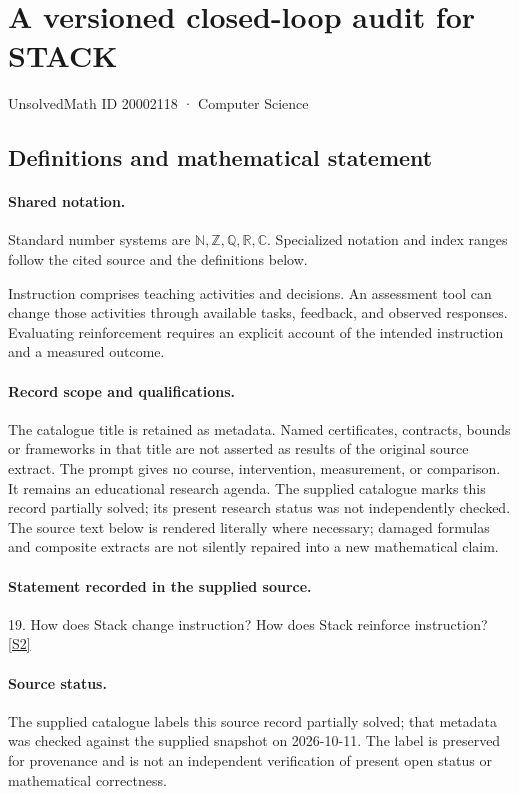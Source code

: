 \documentclass[11pt]{article}
\newcommand{\sref}[2]{\hyperlink{source:#1:#2}{[S#2]}}
\begin{document}
\setcounter{section}{20002117}
\section{A versioned closed-loop audit for STACK}\label{20002118}
{\small\sffamily UnsolvedMath ID 20002118 · Computer Science}
\subsection{Definitions and mathematical statement}

\paragraph{Shared notation.}Standard number systems are $\mathbb N,\mathbb Z,\mathbb Q,\mathbb R,\mathbb C$. Specialized notation and index ranges follow the cited source and the definitions below.


Instruction comprises teaching activities and decisions. An assessment tool can change those activities through available tasks, feedback, and observed responses. Evaluating reinforcement requires an explicit account of the intended instruction and a measured outcome.
\paragraph{Record scope and qualifications.}
The catalogue title is retained as metadata. Named certificates, contracts, bounds or frameworks in that title are not asserted as results of the original source extract.
The prompt gives no course, intervention, measurement, or comparison. It remains an educational research agenda. The supplied catalogue marks this record partially solved; its present research status was not independently checked.
The source text below is rendered literally where necessary; damaged formulas and composite extracts are not silently repaired into a new mathematical claim.
\paragraph{Statement recorded in the supplied source.}
19. How does Stack change instruction? How does Stack reinforce instruction? \sref{20002118}{2}
\paragraph{Source status.}
The supplied catalogue labels this source record partially solved; that metadata was checked against the supplied snapshot on 2026-10-11. The label is preserved for provenance and is not an independent verification of present open status or mathematical correctness.
\end{document}
